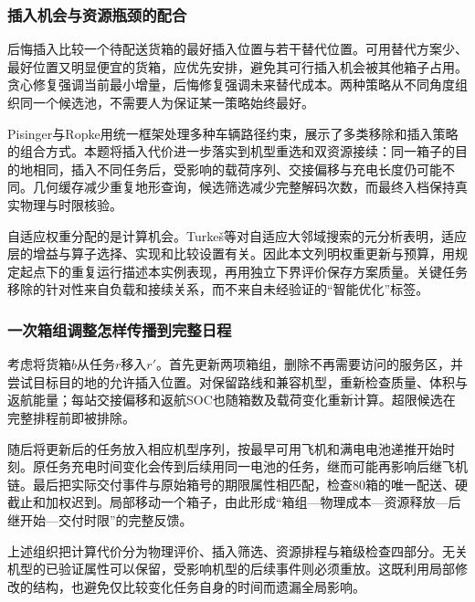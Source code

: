 \subsubsection{插入机会与资源瓶颈的配合}
后悔插入比较一个待配送货箱的最好插入位置与若干替代位置。可用替代方案少、最好位置又明显便宜的货箱，应优先安排，避免其可行插入机会被其他箱子占用。贪心修复强调当前最小增量，后悔修复强调未来替代成本。两种策略从不同角度组织同一个候选池，不需要人为保证某一策略始终最好。

Pisinger与Ropke用统一框架处理多种车辆路径约束，展示了多类移除和插入策略的组合方式\cite{pisinger2007}。本题将插入代价进一步落实到机型重选和双资源接续：同一箱子的目的地相同，插入不同任务后，受影响的载荷序列、交接偏移与充电长度仍可能不同。几何缓存减少重复地形查询，候选筛选减少完整解码次数，而最终入档保持真实物理与时限核验。

自适应权重分配的是计算机会。Turkeš等对自适应大邻域搜索的元分析表明，适应层的增益与算子选择、实现和比较设置有关\cite{turkes2021}。因此本文列明权重更新与预算，用规定起点下的重复运行描述本实例表现，再用独立下界评价保存方案质量。关键任务移除的针对性来自负载和接续关系，而不来自未经验证的“智能优化”标签。

\subsubsection{一次箱组调整怎样传播到完整日程}
考虑将货箱$b$从任务$r$移入$r'$。首先更新两项箱组，删除不再需要访问的服务区，并尝试目标目的地的允许插入位置。对保留路线和兼容机型，重新检查质量、体积与返航能量；每站交接偏移和返航SOC也随箱数及载荷变化重新计算。超限候选在完整排程前即被排除。

随后将更新后的任务放入相应机型序列，按最早可用飞机和满电电池递推开始时刻。原任务充电时间变化会传到后续用同一电池的任务，继而可能再影响后继飞机链。最后把实际交付事件与原始箱号的期限属性相匹配，检查80箱的唯一配送、硬截止和加权迟到。局部移动一个箱子，由此形成“箱组—物理成本—资源释放—后继开始—交付时限”的完整反馈。

上述组织把计算代价分为物理评价、插入筛选、资源排程与箱级检查四部分。无关机型的已验证属性可以保留，受影响机型的后续事件则必须重放。这既利用局部修改的结构，也避免仅比较变化任务自身的时间而遗漏全局影响。
